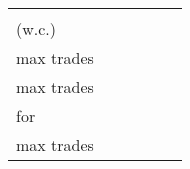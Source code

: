 
\begin{table*}[t]
\centering
\begin{tabular} {|l|r|r|r|r|r|}


\multicolumn{1}{c}{} & 



\headrow{\footnotesize \shortstack{Max trades \\ (w.c.)}} & 
\headrow{\footnotesize \shortstack{L1 Gas for \\ max trades}} & 


\headrow{\footnotesize \shortstack{L1 Gas for \\ max trades}} &
\headrow{\footnotesize \shortstack{L2 ArbGas \\for \\max trades}} &
\headrow{\footnotesize Size}  \\ \hline


\end{tabular}
\end{table*}
